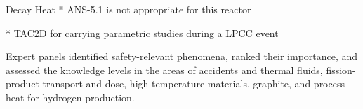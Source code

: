 Decay Heat
* ANS-5.1 is not appropriate for this reactor

* TAC2D for carrying parametric studies during a LPCC event





Expert panels identified safety-relevant phenomena, ranked their importance, and assessed
the knowledge levels in the areas of accidents and thermal fluids, fission-product transport and dose,
high-temperature materials, graphite, and process heat for hydrogen production.






